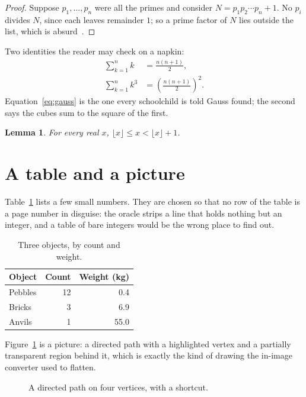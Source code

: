 \documentclass[11pt]{article}
\newtheorem{lemma}[theorem]{Lemma}
\theoremstyle{definition}
\begin{document}
\begin{proof}
  Suppose $p_1, \dots, p_n$ were all the primes and consider
  $N = p_1 p_2 \cdots p_n + 1$. No $p_i$ divides $N$, since each leaves
  remainder $1$; so a prime factor of $N$ lies outside the list, which is
  absurd~\cite{euclid}.
\end{proof}

Two identities the reader may check on a napkin:
\begin{align}
  \sum_{k=1}^{n} k &= \frac{n(n+1)}{2}, \label{eq:gauss} \\
  \sum_{k=1}^{n} k^3 &= \left( \frac{n(n+1)}{2} \right)^{2} .
\end{align}
Equation~\eqref{eq:gauss} is the one every schoolchild is told Gauss found;
the second says the cubes sum to the square of the first.

\begin{lemma}
  For every real $x$, $\lfloor x \rfloor \le x < \lfloor x \rfloor + 1$.
\end{lemma}

\section{A table and a picture}

Table~\ref{tab:sizes} lists a few small numbers. They are chosen so that no
row of the table is a page number in disguise: the oracle strips a line
that holds nothing but an integer, and a table of bare integers would be
the wrong place to find out.

\begin{table}[ht]
  \centering
  \begin{tabular}{lrr}
    \toprule
    Object & Count & Weight (kg) \\
    \midrule
    Pebbles & 12 & 0.4 \\
    Bricks & 3 & 6.9 \\
    Anvils & 1 & 55.0 \\
    \bottomrule
  \end{tabular}
  \caption{Three objects, by count and weight.}
  \label{tab:sizes}
\end{table}

Figure~\ref{fig:path} is a picture: a directed path with a highlighted
vertex and a partially transparent region behind it, which is exactly the
kind of drawing the in-image converter used to flatten.

\begin{figure}[ht]
  \centering
  \caption{A directed path on four vertices, with a shortcut.}
  \label{fig:path}
\end{figure}
\end{document}
